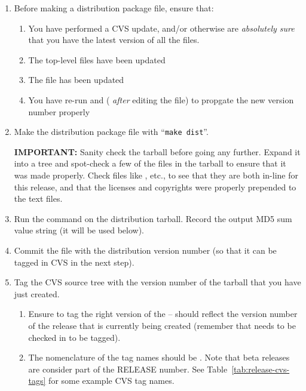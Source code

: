 \begin{enumerate}

\item Before making a distribution package file, ensure that:

  \begin{enumerate}
  \item You have performed a CVS update, and/or otherwise are {\em
      absolutely sure} that you have the latest version of all the
    files.
  \item The top-level  files have been updated
  \item The  file has been updated
  \item You have re-run  and  ({\em
      after} editing the  file) to propgate the new
    version number properly
  \end{enumerate}

\item Make the distribution package file with ``{\tt make dist}''.
  
  {\bf IMPORTANT:} Sanity check the tarball before going any further.
  Expand it into a tree and spot-check a few of the files in the
  tarball to ensure that it was made properly.  Check files like
  , etc., to see that they are both in-line for this
  release, and that the licenses and copyrights were properly
  prepended to the text files.
  
\item Run the  command on the distribution tarball.
  Record the output MD5 sum value string (it will be used below).
\label{dist-step-md5sum}
        
\item Commit the  file with the distribution version
  number (so that it can be tagged in CVS in the next step).

\item Tag the CVS source tree with the version number of the tarball
  that you have just created.  

  \begin{enumerate}
  \item Ensure to tag the right version of the  --
     should reflect the version number of the release
    that is currently being created (remember that 
    needs to be checked in to be tagged).

  \item The nomenclature of the tag names should be
    .  Note that beta releases are
    consider part of the RELEASE number.  See
    Table~\ref{tab:release-cvs-tags} for some example CVS tag names.


\end{enumerate}
\end{enumerate}
